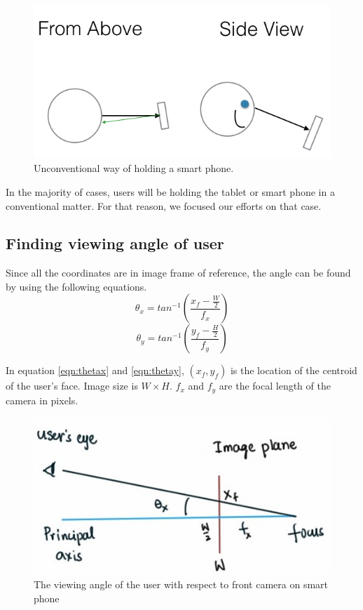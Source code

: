 \documentclass[12pt,twocolumn,letterpaper]{article}
\begin{document}
\begin{figure}[!htbp]
\centering
\includegraphics[height=30 mm]{unconventional.png}
\caption{Unconventional way of holding a smart phone.}
\label{fig:unconventional}
\end{figure}

In the majority of cases, users will be holding the tablet or smart phone in a conventional matter.  For that reason, we focused our efforts on that case.

\subsection{Finding viewing angle of user}
Since all the coordinates are in image frame of reference, the angle can be found by using the following equations. 
\begin{equation}
\theta_x = tan^{-1} \left( \frac{x_f - \frac{W}{2}}{f_x} \right)
\label{eqn:thetax}
\end{equation}
\begin{equation}
\theta_y = tan^{-1} \left( \frac{y_f - \frac{H}{2}}{f_y} \right)
\label{eqn:thetay}
\end{equation}

In equation \ref{eqn:thetax} and \ref{eqn:thetay}, $(x_f, y_f)$ is the location of the centroid of the user's face. Image size is $W \times H$. $f_x$ and $f_y$ are the focal length of the camera in pixels.

\begin{figure}[!htbp]
\includegraphics[scale=0.5]{view_angle}
\caption{The viewing angle of the user with respect to front camera on smart phone}
\label{fig:viewangle}
\end{figure}
\end{document}
